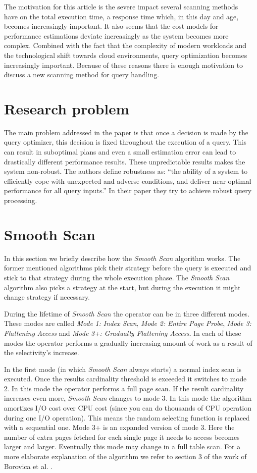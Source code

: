\documentclass[a4paper,11pt,twoside]{article}
\begin{document}
The motivation for this article is the severe impact several scanning methods have on the total execution time, a response time which, in this day and age, becomes increasingly important. It also seems that the cost models for performance estimations deviate increasingly as the system becomes more complex. Combined with the fact that the complexity of modern workloads and the technological shift towards cloud environments, query optimization becomes increasingly important. Because of these reasons there is enough motivation to discuss a new scanning method for query handling.

\section{Research problem}
The main problem addressed in the paper is that once a decision is made by the query optimizer, this decision is fixed throughout the execution of a query. This can result in suboptimal plans and even a small estimation error can lead to drastically different performance results. These unpredictable results makes the system non-robust. The authors define robustness as: ``the ability of a system to efficiently cope with unexpected and adverse conditions, and deliver near-optimal performance for all query inputs.'' \cite{smoothscan} In their paper they try to achieve robust query processing.

\section{Smooth Scan}
In this section we briefly describe how the \emph{Smooth Scan} algorithm works. The former mentioned algorithms pick their strategy before the query is executed and stick to that strategy during the whole execution phase. The \emph{Smooth Scan} algorithm also picks a strategy at the start, but during the execution it might change strategy if necessary.

During the lifetime of \emph{Smooth Scan} the operator can be in three different modes. These modes are called \emph{Mode 1: Index Scan}, \emph{Mode 2: Entire Page Probe}, \emph{Mode 3: Flattening Access} and \emph{Mode 3+: Gradually Flattening Access}. In each of these modes the operator performs a gradually increasing amount of work as a result of the selectivity's increase.

In the first mode (in which \emph{Smooth Scan} always starts) a normal index scan is executed. Once the results cardinality threshold is exceeded it switches to mode 2. In this mode the operator performs a full page scan. If the result cardinality increases even more, \emph{Smooth Scan} changes to mode 3. In this mode the algorithm amortizes I/O cost over CPU cost (since you can do thousands of CPU operation during one I/O operation). This means the random selecting function is replaced with a sequential one. Mode 3+ is an expanded version of mode 3. Here the number of extra pages fetched for each single page it needs to access becomes larger and larger. Eventually this mode may change in a full table scan. For a more elaborate explanation of the algorithm we refer to section 3 of the work of Borovica et al. \cite{smoothscan}.
\end{document}
